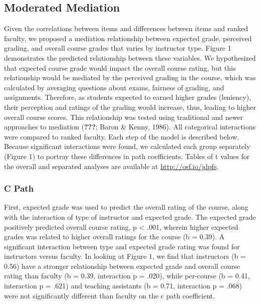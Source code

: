 \documentclass[man]{apa6}
\theoremstyle{definition}
\theoremstyle{definition}
\theoremstyle{definition}
\theoremstyle{remark}
\begin{document}
\hypertarget{moderated-mediation}{%
\subsection{Moderated Mediation}\label{moderated-mediation}}

Given the correlations between items and differences between items and
ranked faculty, we proposed a mediation relationship between expected
grade, perceived grading, and overall course grades that varies by
instructor type. Figure 1 demonstrates the predicted relationship
between these variables. We hypothesized that expected course grade
would impact the overall course rating, but this relationship would be
mediated by the perceived grading in the course, which was calculated by
averaging questions about exams, fairness of grading, and assignments.
Therefore, as students expected to earned higher grades (leniency),
their perception and ratings of the grading would increase, thus,
leading to higher overall course scores. This relationship was tested
using traditional and newer approaches to mediation ({\textbf{???}};
Baron \& Kenny, 1986). All categorical interactions were compared to
ranked faculty. Each step of the model is described below. Because
significant interactions were found, we calculated each group separately
(Figure 1) to portray these differences in path coefficients. Tables of
t values for the overall and separated analyses are available at
\url{http://osf.io/jdpfs}.

\hypertarget{c-path}{%
\subsubsection{C Path}\label{c-path}}

First, expected grade was used to predict the overall rating of the
course, along with the interaction of type of instructor and expected
grade. The expected grade positively predicted overall course rating, p
\textless{} .001, wherein higher expected grades was related to higher
overall ratings for the course (b = 0.39). A significant interaction
between type and expected grade rating was found for instructors versus
faculty. In looking at Figure 1, we find that instructors (b = 0.56)
have a stronger relationship between expected grade and overall course
rating than faculty (b = 0.39, interaction p = .020), while per-course
(b = 0.41, interaction p = .621) and teaching assistants (b = 0.71,
interaction p = .068) were not significantly different than faculty on
the c path coefficient.
\end{document}
